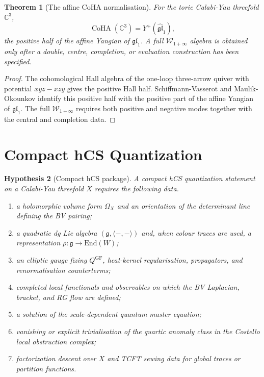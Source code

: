 \documentclass[11pt]{amsart}
\newtheorem{theorem}{Theorem}[section]
\newtheorem{hypothesis}[theorem]{Hypothesis}
\theoremstyle{definition}
\theoremstyle{remark}
\providecommand{\CoHA}{\operatorname{CoHA}}
\providecommand{\End}{\mathrm{End}}
\providecommand{\cW}{\mathcal W}
\providecommand{\fg}{\mathfrak g}
\providecommand{\C}{\mathbb C}
\begin{document}
\begin{theorem}[The affine CoHA normalisation]
\label{thm:c3-coha}
For the toric Calabi-Yau threefold $\C^3$,
\[
  \CoHA(\C^3)=Y^+(\widehat{\mathfrak{gl}}_1),
\]
the positive half of the affine Yangian of $\mathfrak{gl}_1$. A full
$\cW_{1+\infty}$ algebra is obtained only after a double, centre,
completion, or evaluation construction has been specified.
\end{theorem}

\begin{proof}
The cohomological Hall algebra of the one-loop three-arrow quiver with
potential $xyz-xzy$ gives the positive Hall half. Schiffmann-Vasserot
and Maulik-Okounkov identify this positive half with the positive part
of the affine Yangian of $\mathfrak{gl}_1$. The full
$\cW_{1+\infty}$ requires both positive and negative modes together
with the central and completion data.
\end{proof}

\section{Compact hCS Quantization}
\label{sec:compact-hcs}

\begin{hypothesis}[Compact hCS package]
\label{hyp:compact-hcs}
A compact hCS quantization statement on a Calabi-Yau threefold $X$
requires the following data.
\begin{enumerate}[label=\textup{(\roman*)}]
\item a holomorphic volume form $\Omega_X$ and an orientation of the
determinant line defining the BV pairing;
\item a quadratic dg Lie algebra $(\fg,\langle-,-\rangle)$ and, when
colour traces are used, a representation $\rho:\fg\to\End(W)$;
\item an elliptic gauge fixing $Q^{\mathrm{GF}}$, heat-kernel
regularisation, propagators, and renormalisation counterterms;
\item completed local functionals and observables on which the BV
Laplacian, bracket, and RG flow are defined;
\item a solution of the scale-dependent quantum master equation;
\item vanishing or explicit trivialisation of the quartic anomaly
class in the Costello local obstruction complex;
\item factorization descent over $X$ and TCFT sewing data for global
traces or partition functions.
\end{enumerate}
\end{hypothesis}
\end{document}
